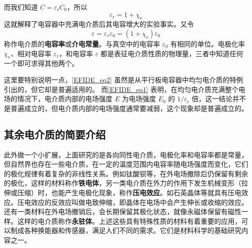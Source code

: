 而我们知道 $C=\varepsilon_\mathrm{r}C_0$，所以
\begin{equation} \label{EFIDE_eq2}
\varepsilon_{\mathrm{r}}=1+\chi_{\mathrm{e}}
\end{equation}
这就解释了电容器中充满电介质后其电容增大的实验事实。又令
\begin{equation}
\varepsilon=\varepsilon_{r} \varepsilon_{0}=\left(1+\chi_{\mathrm{e}}\right) \varepsilon_{0}
\end{equation}
称作电介质的\textbf{电容率}或\textbf{介电常量}。与真空中的电容率 $\varepsilon_0$ 有相同的单位。电极化率 $\chi_{\mathrm{e}}$、相对电容率 $\varepsilon_\mathrm{r}$，和电容率 $\varepsilon$ 都是表征电介质性质的物理量，三者中知道任何一个即可求得其他两个。

这里要特别说明一点，\autoref{EFIDE_eq2} 虽然是从平行板电容器中均匀电介质的特例引出的，但它却是普遍适用的。
而\autoref{EFIDE_eq1} 表明，在均匀电介质充满整个电场的情况下，电介质内部的电场强度 $E $ 为电场强度 $E_0$ 的 $1/\varepsilon_{\mathrm{r}}$ 倍，这一结论并不是普遍成立的，但电介质内部的电场强度通常要减弱，这个现象却是普遍成立的。

\subsection{其余电介质的简要介绍}
此外做一个小扩展，上面研究的是各向同性电介质，电极化率和电容率都是常量，但自然界也存在一些电介质，在一定的温度范围内电容率随电场强度而变化，它们的极化规律有着复杂的非线性关系。例如钛酸钡等，在外电场撤除后仍保留有剩余的极化，这样的材料称作\textbf{铁电体}，另一类电介质在外力的作用下发生机械变形（拉伸或压缩）时，也能产生电极化现象，称作\textbf{压电效应}。如石英晶体等就具有压电效应。压电效应的反效应叫做电致伸缩，即晶体在电场中会产生伸长或收缩的效应。还有一类材料在外电场撤销后，会长期保留其极化状态，就像永磁体保留有磁性一样。这样的电介质称作\textbf{永驻体}。上述这些具有特殊性质的材料有着重要的应用，可以制成各种换能器和传感器，满足人们不同的需求。它们是材料科学的基础研究内容之一。
